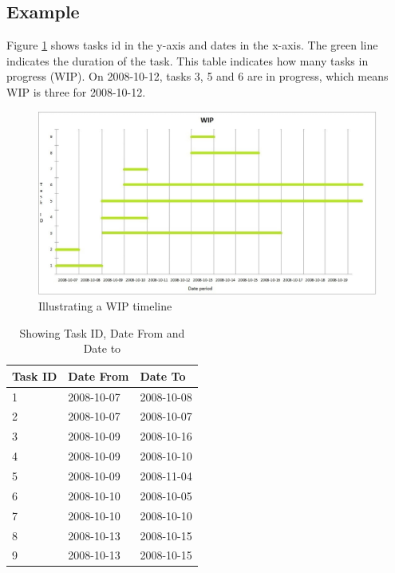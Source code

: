 \documentclass[UKenglish]{ifimaster}  %
\begin{document}
\subsection{Example}
\label{sec:Example}
Figure \ref{wip_timeline}  shows tasks id in the y-axis and dates in the x-axis. The green line indicates the duration of the task. This table indicates how many tasks in progress (WIP). On 2008-10-12, tasks 3, 5 and 6 are in progress, which means WIP is three for 2008-10-12.  
\begin{figure}[ht!]
\centering
\includegraphics[width=150mm]{Picture/wip_example.jpg}
\caption{Illustrating a WIP timeline}
\label{wip_timeline}
\end{figure}

\begin{table}[ht]
\begin{center}
    \begin{tabular}{| l | l | p{5cm} |}
    \hline
   Task ID &   Date From  & Date To\\ \hline
     1 & 2008-10-07 & 2008-10-08   \\ \hline
     2 & 2008-10-07 & 2008-10-07   \\ \hline
     3 & 2008-10-09 & 2008-10-16   \\ \hline
     4 & 2008-10-09 & 2008-10-10   \\ \hline
     5 & 2008-10-09 & 2008-11-04   \\ \hline
     6 & 2008-10-10 & 2008-10-05   \\ \hline
     7 & 2008-10-10 & 2008-10-10   \\ \hline
     8 & 2008-10-13 & 2008-10-15   \\ \hline
     9 & 2008-10-13 & 2008-10-15   \\ \hline
    \end{tabular}
\caption{Showing Task ID, Date From and Date to}
\label{wt:2} %
\end{center}
\end{table}
\end{document}
